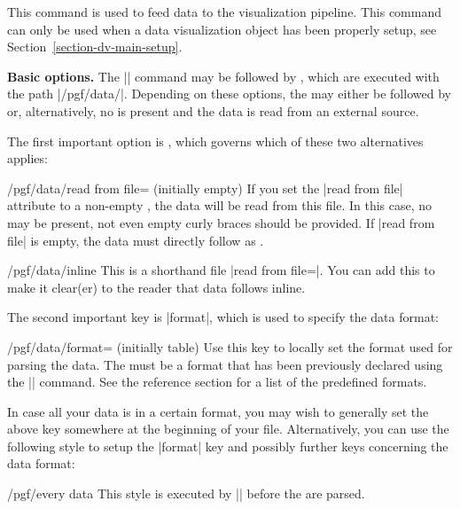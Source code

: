 \begin{command}{\pgfdata{}}
  This command is used to feed data to the visualization
  pipeline. This command can only be used when a data visualization
  object has been properly setup, see
  Section~\ref{section-dv-main-setup}.

  \medskip
  \textbf{Basic options.}
  The |\pgfdata| command may be followed by , which are
  executed with the path |/pgf/data/|. Depending
  on these options, the  may either be followed by
   or, alternatively, no  is
  present and the data is read from an external source.

  The first important option is , which governs which of these
  two alternatives applies:
  \begin{key}{/pgf/data/read from file= (initially \normalfont empty)}
    If you set the |read from file| attribute to a non-empty ,
    the data will be read from this file. In this case, no
     may be present, not even empty curly braces
    should be provided. If |read from file| is empty, the  data must
    directly  follow as .
\begin{codeexample}
\pgfdata[format=table, read from file=file1.csv]
\pgfdata[format=table, read from file=file2.csv]
\end{codeexample}
\begin{codeexample}
\end{codeexample}
  \end{key}
  \begin{key}{/pgf/data/inline}
    This is a shorthand file |read from file={}|. You can add this to
    make it clear(er) to the reader that data follows inline.    
  \end{key}
  The second important key is |format|, which is used to specify the
  data format:
  \begin{key}{/pgf/data/format= (initially table)}
    Use this key to locally set the format used for parsing the
    data. The  must be a format that has been previously
    declared using the |\pgfdeclaredataformat| command. See the
    reference section for a list of the predefined formats.
  \end{key}
  In case all your data is in a certain format, you may wish to
  generally set the above key somewhere at the beginning of your
  file. Alternatively, you can use the following style to setup the
  |format| key and possibly further keys concerning the data format:
  \begin{stylekey}{/pgf/every data}
    This style is executed by |\pgfdata| before the  are
    parsed.


\end{stylekey}
\end{command}
